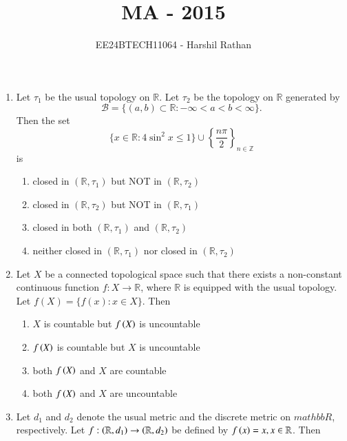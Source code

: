\documentclass[journal]{IEEEtran}
\begin{document}

\vspace{3cm}

\title{MA - 2015}
\author{EE24BTECH11064 - Harshil Rathan}
\maketitle

\renewcommand{\thefigure}{\theenumi}
\renewcommand{\thetable}{\theenumi}

\begin{enumerate}
\item Let $\tau_1$ be the usual topology on $\mathbb{R}$. Let $\tau_2$ be the topology on $\mathbb{R}$ generated by \[
\mathcal{B} = \{ (a, b) \subset \mathbb{R} : -\infty < a < b < \infty \}.
\]
Then the set 
\[
\{ x \in \mathbb{R} : 4 \sin^2 x \leq 1 \} \cup \left\{ \frac{n\pi}{2} \right\}_{n \in \mathbb{Z}}
\]
is
\begin{enumerate}
    \item closed in $(\mathbb{R}, \tau_1)$ but NOT in $(\mathbb{R}, \tau_2)$
    \item closed in $(\mathbb{R}, \tau_2)$ but NOT in $(\mathbb{R}, \tau_1)$
    \item closed in both $(\mathbb{R}, \tau_1)$ and $(\mathbb{R}, \tau_2)$
    \item neither closed in $(\mathbb{R}, \tau_1)$ nor closed in $(\mathbb{R}, \tau_2)$
\end{enumerate}
\vspace{0.5cm}
\item Let $X$ be a connected topological space such that there exists a non-constant continuous function 
$f : X \to \mathbb{R}$,
where $\mathbb{R}$ is equipped with the usual topology. Let 
$f(X) = \{ f(x) : x \in X \}$.
Then
\begin{enumerate}
      \item $X$ is countable but $f\left(X\right)$ is uncountable
        \item $f\left(X\right)$ is countable but $X$ is uncountable
        \item both $f\left(X\right)$ and $X$ are countable
        \item both $f\left(X\right)$ and $X$ are uncountable
\end{enumerate}
\vspace{0.5cm}
\item Let $d_1$ and $d_2$ denote the usual metric and the discrete metric on $mathbb{R}$, respectively. Let $f: \left(\mathbb{R},d_1\right)\rightarrow \left(\mathbb{R},d_2\right)$ be defined by $f\left(x\right)=x,x\in \mathbb{R}$. Then 

\end{enumerate}
\end{document}

